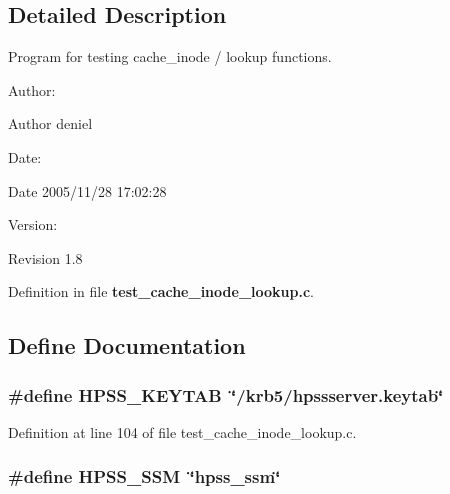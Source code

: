 \subsection{Detailed Description}
Program for testing cache\_\-inode / lookup functions. 

\begin{Desc}
\item[Author:]\begin{Desc}
\item[Author]deniel \end{Desc}
\end{Desc}
\begin{Desc}
\item[Date:]\begin{Desc}
\item[Date]2005/11/28 17:02:28 \end{Desc}
\end{Desc}
\begin{Desc}
\item[Version:]\begin{Desc}
\item[Revision]1.8 \end{Desc}
\end{Desc}


Definition in file {\bf test\_\-cache\_\-inode\_\-lookup.c}.

\subsection{Define Documentation}
\subsubsection{\setlength{\rightskip}{0pt plus 5cm}\#define HPSS\_\-KEYTAB\ \char`\"{}/krb5/hpssserver.keytab\char`\"{}}\label{test__cache__inode__lookup_8c_a1}




Definition at line 104 of file test\_\-cache\_\-inode\_\-lookup.c.
\subsubsection{\setlength{\rightskip}{0pt plus 5cm}\#define HPSS\_\-SSM\ \char`\"{}hpss\_\-ssm\char`\"{}}\label{test__cache__inode__lookup_8c_a0}




